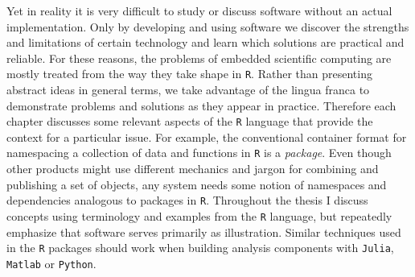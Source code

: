 Yet in reality it is very difficult to study or discuss software without an actual implementation. Only by developing and using software we discover the strengths and limitations of certain technology and learn which solutions are practical and reliable. For these reasons, the problems of embedded scientific computing are mostly treated from the way they take shape in \texttt{R}. Rather than presenting abstract ideas in general terms, we take advantage of the lingua franca to demonstrate problems and solutions as they appear in practice. Therefore each chapter discusses some relevant aspects of the \texttt{R} language that provide the context for a particular issue. For example, the conventional container format for namespacing a collection of data and functions in \texttt{R} is a \emph{package}. Even though other products might use different mechanics and jargon for combining and publishing a set of objects, any system needs some notion of namespaces and dependencies analogous to packages in \texttt{R}. Throughout the thesis I discuss concepts using terminology and examples from the \texttt{R} language, but repeatedly emphasize that software serves primarily as illustration. Similar techniques used in the \texttt{R} packages should work when building analysis components with \texttt{Julia}, \texttt{Matlab} or \texttt{Python}. 



